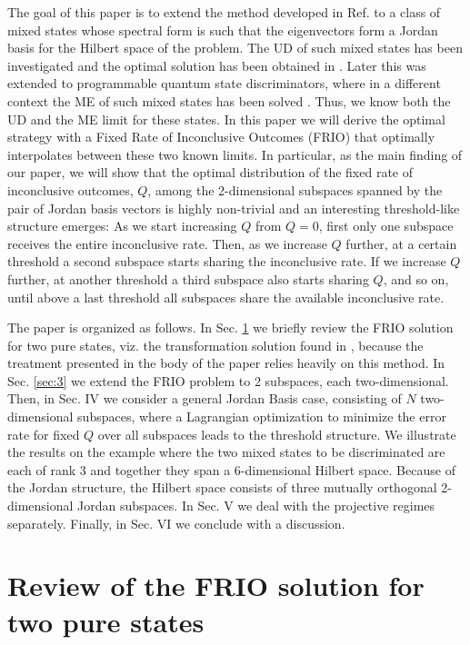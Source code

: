 \documentclass[aps,pra,twocolumn,eqsecnum,showpacs]{revtex4}
\begin{document}
The goal of this paper is to extend the method developed in Ref. \cite{Bagan} to a class of mixed states whose spectral form is such that the eigenvectors form a Jordan basis for the Hilbert space of the problem. The UD of such mixed states has been investigated and the optimal solution has been obtained in \cite{HB,BFH}. Later this was extended to programmable quantum state discriminators, where in a different context the ME of such mixed states has been solved \cite{BBFHH}. Thus, we know both the UD and the ME limit for these states. In this paper we will derive the optimal strategy with a Fixed Rate of Inconclusive Outcomes (FRIO) that optimally interpolates between these two known limits. In particular, as the main finding of our paper, we will show that the optimal distribution of the fixed rate of inconclusive outcomes, $Q$, among the 2-dimensional subspaces spanned by the pair of Jordan basis vectors is highly non-trivial and an interesting threshold-like structure emerges: As we start increasing $Q$ from $Q=0$, first only one subspace receives the entire inconclusive rate. Then, as we increase $Q$ further, at a certain threshold a second subspace starts sharing the inconclusive rate. If we increase $Q$ further, at another threshold a third subspace also starts sharing $Q$, and so on, until above a last threshold all subspaces share the available  inconclusive rate. 


The paper is organized as follows. In Sec. \ref{sec:2} we briefly review the FRIO solution for two pure states, viz. the transformation solution found in \cite{Bagan}, because the treatment presented in the body of the paper relies heavily on this method. In Sec. \ref{sec:3} we extend the FRIO problem to 2 subspaces, each two-dimensional.  Then, in Sec. IV we consider a general Jordan Basis case, consisting of $N$ two-dimensional subspaces, where a Lagrangian optimization to minimize the error rate for fixed $Q$ over all subspaces leads to the threshold structure.  We illustrate the results on the example where the two mixed states to be discriminated are each of rank 3 and together they span a 6-dimensional Hilbert space. Because of the Jordan structure, the Hilbert space consists of three mutually orthogonal 2-dimensional Jordan subspaces.  In Sec. V we deal with the projective regimes separately. Finally, in Sec. VI we conclude with a discussion.  

\section{Review of the FRIO solution for two pure states}
\label{sec:2}
\end{document}
